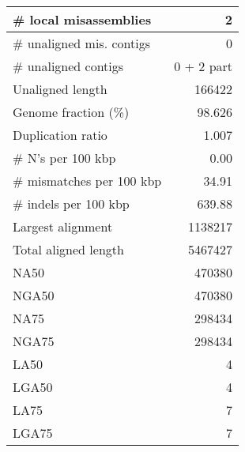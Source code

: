 \documentclass[12pt,a4paper]{article}
\begin{document}
\begin{table}[ht]
\begin{center}
\begin{tabular}{|l*{1}{|r}|}
\# local misassemblies & 2 \\ \hline
\# unaligned mis. contigs & 0 \\ \hline
\# unaligned contigs & 0 + 2 part \\ \hline
Unaligned length & 166422 \\ \hline
Genome fraction (\%) & 98.626 \\ \hline
Duplication ratio & 1.007 \\ \hline
\# N's per 100 kbp & 0.00 \\ \hline
\# mismatches per 100 kbp & 34.91 \\ \hline
\# indels per 100 kbp & 639.88 \\ \hline
Largest alignment & 1138217 \\ \hline
Total aligned length & 5467427 \\ \hline
NA50 & 470380 \\ \hline
NGA50 & 470380 \\ \hline
NA75 & 298434 \\ \hline
NGA75 & 298434 \\ \hline
LA50 & 4 \\ \hline
LGA50 & 4 \\ \hline
LA75 & 7 \\ \hline
LGA75 & 7 \\ \hline
\end{tabular}
\end{center}
\end{table}
\end{document}
